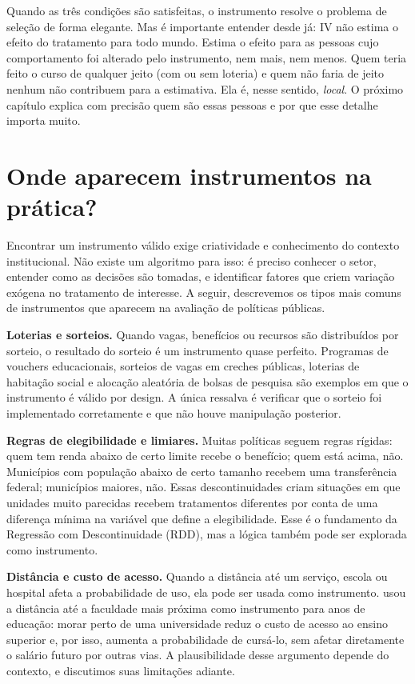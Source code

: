 Quando as três condições são satisfeitas, o instrumento resolve o problema de seleção de forma elegante. Mas é importante entender desde já: IV não estima o efeito do tratamento para todo mundo. Estima o efeito para as pessoas cujo comportamento foi alterado pelo instrumento, nem mais, nem menos. Quem teria feito o curso de qualquer jeito (com ou sem loteria) e quem não faria de jeito nenhum não contribuem para a estimativa. Ela é, nesse sentido, \textit{local}. O próximo capítulo explica com precisão quem são essas pessoas e por que esse detalhe importa muito.

\section{Onde aparecem instrumentos na prática?}
\label{sec:exemplos_instrumentos}

Encontrar um instrumento válido exige criatividade e conhecimento do contexto institucional. Não existe um algoritmo para isso: é preciso conhecer o setor, entender como as decisões são tomadas, e identificar fatores que criem variação exógena no tratamento de interesse. A seguir, descrevemos os tipos mais comuns de instrumentos que aparecem na avaliação de políticas públicas.

\textbf{Loterias e sorteios.} Quando vagas, benefícios ou recursos são distribuídos por sorteio, o resultado do sorteio é um instrumento quase perfeito. Programas de vouchers educacionais, sorteios de vagas em creches públicas, loterias de habitação social e alocação aleatória de bolsas de pesquisa são exemplos em que o instrumento é válido por design. A única ressalva é verificar que o sorteio foi implementado corretamente e que não houve manipulação posterior.

\textbf{Regras de elegibilidade e limiares.} Muitas políticas seguem regras rígidas: quem tem renda abaixo de certo limite recebe o benefício; quem está acima, não. Municípios com população abaixo de certo tamanho recebem uma transferência federal; municípios maiores, não. Essas descontinuidades criam situações em que unidades muito parecidas recebem tratamentos diferentes por conta de uma diferença mínima na variável que define a elegibilidade. Esse é o fundamento da Regressão com Descontinuidade (RDD), mas a lógica também pode ser explorada como instrumento.

\textbf{Distância e custo de acesso.} Quando a distância até um serviço, escola ou hospital afeta a probabilidade de uso, ela pode ser usada como instrumento. \citet{Card1995} usou a distância até a faculdade mais próxima como instrumento para anos de educação: morar perto de uma universidade reduz o custo de acesso ao ensino superior e, por isso, aumenta a probabilidade de cursá-lo, sem afetar diretamente o salário futuro por outras vias. A plausibilidade desse argumento depende do contexto, e discutimos suas limitações adiante.

